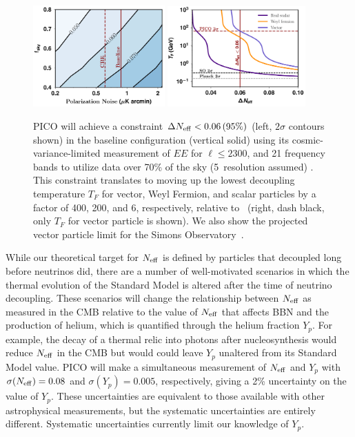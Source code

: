 \documentclass[PICOReport.tex]{subfiles}
\begin{document}
\begin{figure}[t!]
\begin{center}
\includegraphics[width=0.45\textwidth]{images/Neff_final.pdf}
\includegraphics[width=0.47\textwidth]{images/Tf_pico.pdf}
\vspace{-0.15in}
\caption{ \captiontext PICO will achieve a constraint $\Delta {N_{\rm eff}} < 0.06\, (95\%)$ (left, $2\sigma$ contours shown) in the baseline configuration (vertical solid) using its cosmic-variance-limited measurement of $EE$ for $\ell \leq 2300$, and 21 frequency bands to utilize data over 70\% of the sky (5\arcmin\ resolution assumed) . This constraint translates to moving up the lowest decoupling temperature $T_{F}$ for vector, Weyl Fermion, and scalar particles by a factor of 400, 200, and 6, respectively, relative to \planck\ (right, dash black, only $T_{F}$ for vector particle is shown). We also show the projected vector particle limit for the Simons Observatory~\citep{SOscience}. }
\label{fig:Neff_future}  
\end{center}
\vspace{-0.15in}
\end{figure}

While our theoretical target for ${N_{\rm eff}}$ is defined by particles that decoupled long before neutrinos did, there are a number of well-motivated scenarios in which the thermal evolution of the Standard Model is altered after the time of neutrino decoupling.  These scenarios will change the relationship between ${N_{\rm eff}}$ as measured in the CMB relative to the value of ${N_{\rm eff}}$ that affects BBN and the production of helium, which is quantified through the helium fraction $Y_p$.  For example, the decay of a thermal relic into photons after nucleosynthesis would reduce ${N_{\rm eff}}$ in the CMB but would could leave $Y_p$ unaltered from its Standard Model value.  PICO will make a simultaneous measurement of ${N_{\rm eff}}$ and $Y_p$ with $\sigma({N_{\rm eff}}) = 0.08$ and $\sigma(Y_p) =0.005$, respectively, giving a 2\% uncertainty on the value of $Y_p$. These uncertainties are equivalent to those available with other astrophysical measurements, but the systematic uncertainties are entirely different. Systematic uncertainties currently limit our knowledge of $Y_{p}$. 
\end{document}
